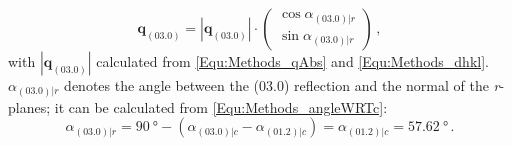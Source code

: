    \begin{equation}
        \mathbf{q}_\mathrm{(03.0)} = 
        \left|\mathbf{q}_\mathrm{(03.0)}\right|\cdot
        \begin{pmatrix}
            \cos\alpha_{(03.0)|r}\\
            \sin\alpha_{(03.0)|r}
        \end{pmatrix}\,,
    \end{equation}
    with $|\mathbf{q}_{(03.0)}|$ calculated from \eqref{Equ:Methods_qAbs} and \eqref{Equ:Methods_dhkl}.
    $\alpha_{(03.0)|r}$ denotes the angle between the (03.0) reflection and the normal of the \textit{r}-planes; it can be calculated from \eqref{Equ:Methods_angleWRTc}:
    \begin{equation}
        \alpha_{(03.0)|r}
        = \qty{90}{\degree}-\left(
            \alpha_{(03.0)|c}-\alpha_{(01.2)|c}
        \right)
        = \alpha_{(01.2)|c}
        = \qty{57.62}{\degree}\,.
    \end{equation}
